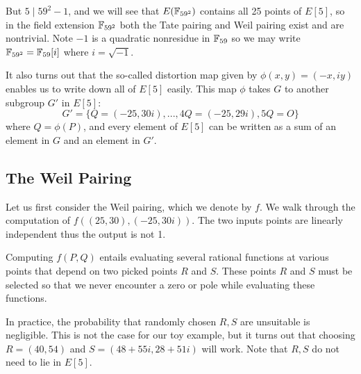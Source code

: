But $5 \mid 59^2 - 1$, and we will see that $E(\mathbb{F}_{59^2})$ contains
all 25 points of $E[5]$, so in the field extension $\mathbb{F}_{59^2}$
both the Tate pairing
and Weil pairing exist and are nontrivial.
Note $-1$ is a quadratic nonresidue in $\mathbb{F}_{59}$
so we may write $\mathbb{F}_{59^2} = \mathbb{F}_{59}[i]$ where $i = \sqrt{-1}$.

It also turns out that the so-called distortion map given by
$\phi(x,y) = (-x, i y)$ enables us to write down all of $E[5]$ easily.
This map $\phi$ takes $G$ to another subgroup $G'$ in $E[5]$:
\[ G' =
\{Q = (-25, 30i), ..., 4Q = (-25, 29i), 5Q = O \} \]
where $Q = \phi(P)$,
and every element of $E[5]$ can be written as a sum of an element in $G$
and an element in $G'$.

\subsection {The Weil Pairing}

Let us first consider the Weil pairing, which we denote by $f$.
We walk through the computation of $f((25,30), (-25,30i))$.
The two inputs points are linearly independent thus the output is not 1.

Computing $f(P, Q)$ entails evaluating several rational functions
at various points that depend on two picked points $R$ and $S$.
These points $R$ and $S$ must be selected so that we never encounter a
zero or pole while evaluating these functions.

In practice, the probability that randomly chosen $R, S$ are unsuitable
is negligible. This is not the case for our toy example, but it turns
out that choosing $R = (40,54)$ and $S = (48+55i,28+51i)$
will work. Note that $R, S$ do not need to lie in $E[5]$.

